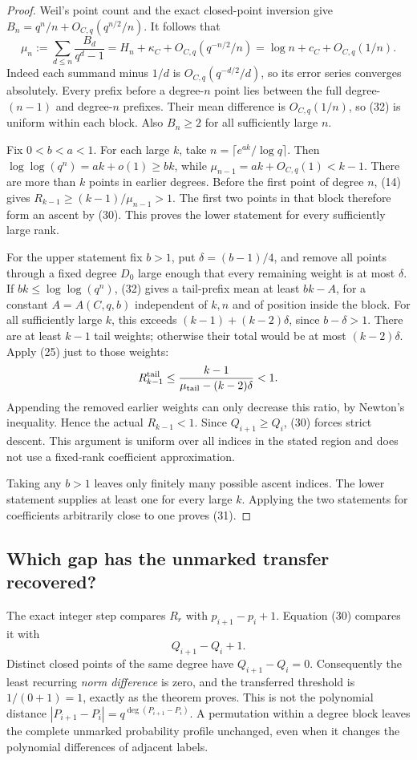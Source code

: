 \documentclass[11pt]{article}
\begin{document}
\begin{proof}
Weil's point count and the exact closed-point inversion give
\(B_n=q^n/n+O_{C,q}(q^{n/2}/n)\).
It follows that
\[
 \mu_n:=\sum_{d\leq n}\frac{B_d}{q^d-1}
       =H_n+\kappa_C+O_{C,q}(q^{-n/2}/n)
       =\log n+c_C+O_{C,q}(1/n).                  \tag{32}
\]
Indeed each summand minus \(1/d\) is \(O_{C,q}(q^{-d/2}/d)\),
so its error series converges absolutely.
Every prefix before a degree-\(n\) point lies between the full
degree-\((n-1)\) and degree-\(n\) prefixes. Their mean difference
is \(O_{C,q}(1/n)\), so (32) is uniform within each block.
Also \(B_n\geq2\) for all sufficiently large \(n\).

Fix \(0<b<a<1\). For each large \(k\), take
\(n=\lceil e^{ak}/\log q\rceil\).
Then \(\log\log(q^n)=ak+o(1)\geq bk\), while
\(\mu_{n-1}=ak+O_{C,q}(1)<k-1\).
There are more than \(k\) points in earlier degrees.
Before the first point of degree \(n\), (14) gives
\(R_{k-1}\geq(k-1)/\mu_{n-1}>1\).
The first two points in that block therefore form an ascent by (30).
This proves the lower statement for every sufficiently large rank.

For the upper statement fix \(b>1\), put
\(\delta=(b-1)/4\), and remove all points through a fixed degree \(D_0\)
large enough that every remaining weight is at most \(\delta\).
If \(bk\leq\log\log(q^n)\), (32) gives a tail-prefix mean
at least \(bk-A\), for a constant \(A=A(C,q,b)\) independent
of \(k,n\) and of position inside the block.
For all sufficiently large \(k\), this exceeds
\((k-1)+(k-2)\delta\), since \(b-\delta>1\).
There are at least \(k-1\) tail weights; otherwise their total
would be at most \((k-2)\delta\).
Apply (25) just to those weights:
\[
 R_{k-1}^{\rm tail}
       \leq\frac{k-1}{\mu_{\rm tail}-(k-2)\delta}<1.
\]
Appending the removed earlier weights can only decrease this ratio,
by Newton's inequality. Hence the actual \(R_{k-1}<1\).
Since \(Q_{i+1}\geq Q_i\), (30) forces strict descent.
This argument is uniform over all indices in the stated region
and does not use a fixed-rank coefficient approximation.

Taking any \(b>1\) leaves only finitely many possible ascent indices.
The lower statement supplies at least one for every large \(k\).
Applying the two statements for coefficients arbitrarily close to one
proves (31).
\end{proof}

\subsection{Which gap has the unmarked transfer recovered?}
The exact integer step compares \(R_r\) with \(p_{i+1}-p_i+1\).
Equation (30) compares it with
\[
                         Q_{i+1}-Q_i+1.
\]
Distinct closed points of the same degree have \(Q_{i+1}-Q_i=0\).
Consequently the least recurring \emph{norm difference} is zero,
and the transferred threshold is \(1/(0+1)=1\), exactly as the
theorem proves. This is not the polynomial distance
\(|P_{i+1}-P_i|=q^{\deg(P_{i+1}-P_i)}\).
A permutation within a degree block leaves the complete unmarked
probability profile unchanged, even when it changes the polynomial
differences of adjacent labels.
\end{document}
